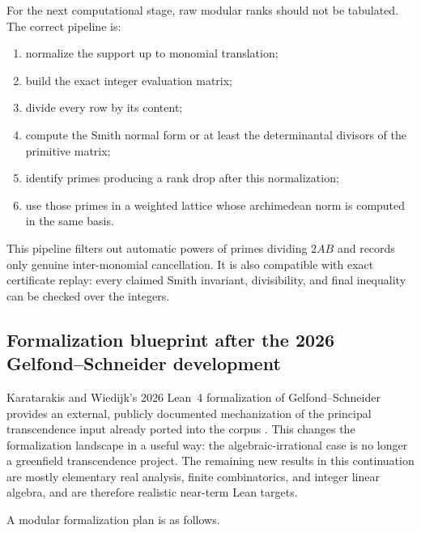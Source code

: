 \documentclass[11pt,oneside]{article}
\theoremstyle{definition}
\theoremstyle{remark}
\begin{document}
For the next computational stage, raw modular ranks should not be tabulated.  The correct
pipeline is:
\begin{enumerate}
\item normalize the support up to monomial translation;
\item build the exact integer evaluation matrix;
\item divide every row by its content;
\item compute the Smith normal form or at least the determinantal divisors of the primitive
matrix;
\item identify primes producing a rank drop after this normalization;
\item use those primes in a weighted lattice whose archimedean norm is computed in the same
basis.
\end{enumerate}
This pipeline filters out automatic powers of primes dividing $2AB$ and records only genuine
inter-monomial cancellation.  It is also compatible with exact certificate replay: every
claimed Smith invariant, divisibility, and final inequality can be checked over the integers.

\subsection{Formalization blueprint after the 2026 Gelfond--Schneider development}
\label{sec:sparse-formalization}

Karatarakis and Wiedijk's 2026 Lean~4 formalization of Gelfond--Schneider provides an external,
publicly documented mechanization of the principal transcendence input already ported into the
corpus \cite{KaratarakisWiedijk2026}.  This changes the formalization landscape in a useful
way: the algebraic-irrational case is no longer a greenfield transcendence project.  The
remaining new results in this continuation are mostly elementary real analysis, finite
combinatorics, and integer linear algebra, and are therefore realistic near-term Lean targets.

A modular formalization plan is as follows.
\end{document}
